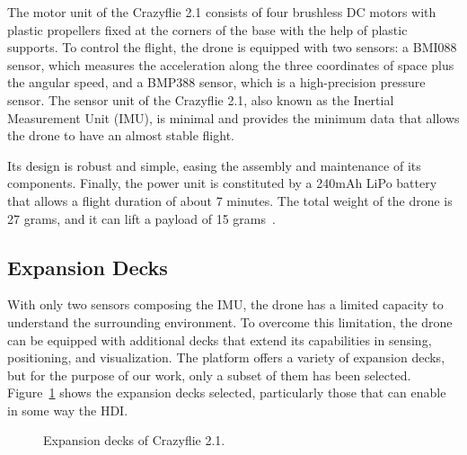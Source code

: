 The motor unit of the Crazyflie 2.1 consists of four brushless DC motors with plastic propellers fixed at the corners of the base with the help of plastic supports.
To control the flight, the drone is equipped with two sensors: a BMI088 sensor, which measures the acceleration along the three coordinates of space plus the angular speed, 
and a BMP388 sensor, which is a high-precision pressure sensor.
The sensor unit of the Crazyflie 2.1, also known as the Inertial Measurement Unit (IMU), is minimal and provides the minimum data that allows the drone to have an almost stable flight.

Its design is robust and simple, easing the assembly and maintenance of its components.
Finally, the power unit is constituted by a 240mAh LiPo battery that allows a flight duration of about 7 minutes. 
The total weight of the drone is 27 grams, and it can lift a payload of 15 grams~\cite{crazyflie}. 


\subsection{Expansion Decks}\label{subsec:expansion_decks}
With only two sensors composing the IMU, the drone has a limited capacity to understand the surrounding environment. 
To overcome this limitation, the drone can be equipped with additional decks that extend its capabilities in sensing, positioning, and visualization.
The platform offers a variety of expansion decks, but for the purpose of our work, only a subset of them has been selected.
Figure~\ref{fig:decks} shows the expansion decks selected, particularly those that can enable in some way the HDI.

\begin{figure}[h]
    \centering
    \quad
    \quad
    \quad
    \quad
    \caption{Expansion decks of Crazyflie 2.1.}\label{fig:decks}
\end{figure}


